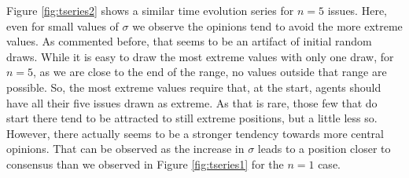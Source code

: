 \documentclass{article}
\begin{document}
    Figure \ref{fig:tseries2} shows a similar time evolution series for $n=5$
    issues. Here, even for small values of $\sigma$ we observe the opinions tend
    to avoid the more extreme values. As commented before, that seems to be an artifact of initial
    random draws. While it is easy to draw the most extreme values with only one
    draw, for $n=5$, as we are close to the end of the range, no values outside
    that range are possible. So, the most extreme values require that, at the
    start, agents should have all their five issues drawn as extreme. As that is
    rare, those few that do start there tend to be attracted to still extreme
    positions, but a little less so. However, there actually seems to be a stronger
    tendency towards more central opinions. That can be observed as the increase in $\sigma$
    leads to a position closer to consensus than we observed in Figure \ref{fig:tseries1} for the $n=1$ case.
\end{document}
